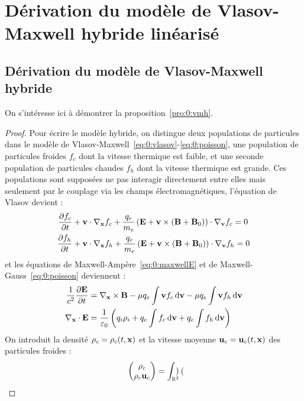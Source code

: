 \section{Dérivation du modèle de Vlasov-Maxwell hybride linéarisé}

\subsection{Dérivation du modèle de Vlasov-Maxwell hybride}
\label{ssec:0:vmh}

On s'intéresse ici à démontrer la proposition~\ref{pro:0:vmh}.
\begin{proof}
  Pour écrire le modèle hybride, on distingue deux populations de particules dans le modèle de Vlasov-Maxwell~\eqref{eq:0:vlasov}-\eqref{eq:0:poisson}, une population de particules froides $f_c$ dont la vitesse thermique est faible, et une seconde population de particules chaudes $f_h$ dont la vitesse thermique est grande. Ces populations sont supposées ne pas interagir directement entre elles mais seulement par le couplage via les champs électromagnétiques, l'équation de Vlasov devient :
  $$
    \begin{aligned}
      \pdv{f_c}{t} &+ \vb{v}\cdot\nabla_{\vb{x}} f_c + \frac{q_e}{m_e}\left( \vb{E} + \vb{v}\times(\vb{B}+\vb{B}_0) \right)\cdot\nabla_{\vb{v}} f_c = 0 \\
      \pdv{f_h}{t} &+ \vb{v}\cdot\nabla_{\vb{x}} f_h + \frac{q_e}{m_e}\left( \vb{E} + \vb{v}\times(\vb{B}+\vb{B}_0) \right)\cdot\nabla_{\vb{v}} f_h = 0
    \end{aligned}
  $$
  et les équations de Maxwell-Ampère~\eqref{eq:0:maxwellE} et de Maxwell-Gauss~\eqref{eq:0:poisson} deviennent :
  $$
    \begin{aligned}
      \frac{1}{c^2}\pdv{\vb{E}}{t} &= \nabla_{\vb{x}}\times \vb{B} - \mu q_e\int \vb{v} f_c\dd{\vb{v}} - \mu q_e\int \vb{v} f_h\dd{\vb{v}} \\
      \nabla_{\vb{x}}\cdot\vb{E} &= \frac{1}{\varepsilon_0}\left( q_i\rho_i + q_e\int f_c\dd{\vb{v}} + q_e\int f_h\dd{\vb{v}} \right)
    \end{aligned}
  $$
  On introduit la densité $\rho_c=\rho_c(t,\vb{x})$ et la vitesse moyenne $\vb{u}_c=\vb{u}_c(t,\vb{x})$ des particules froides :
  $$
    \begin{pmatrix}
      \rho_c \\
      \rho_c \vb{u}_c
    \end{pmatrix}
    =
    \int_{\mathbb{R}^3} \begin{pmatrix}

\end{pmatrix}$$
\end{proof}
